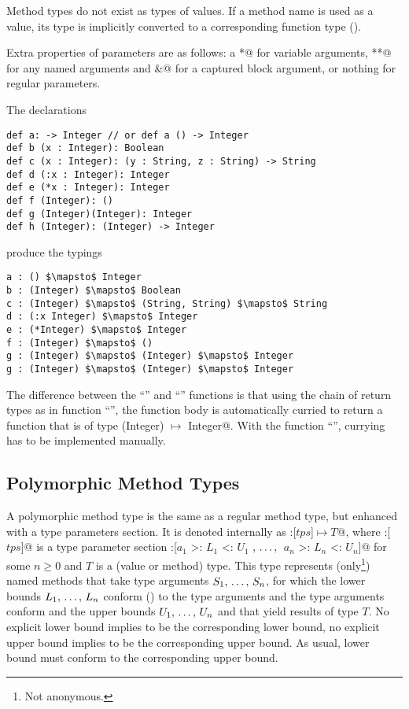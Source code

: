 Method types do not exist as types of values. If a method name is used as a value, its type is implicitly converted to a corresponding function type (). 

Extra properties of parameters are as follows: a \lstinline@*@ for variable arguments, \lstinline@**@ for any named arguments and \lstinline@&@ for a captured block argument, or nothing for regular parameters. 

\example The declarations
\begin{lstlisting}
def a: -> Integer // or def a () -> Integer
def b (x : Integer): Boolean
def c (x : Integer): (y : String, z : String) -> String
def d (:x : Integer): Integer
def e (*x : Integer): Integer
def f (Integer): ()
def g (Integer)(Integer): Integer
def h (Integer): (Integer) -> Integer
\end{lstlisting}
produce the typings
\begin{lstlisting}
a : () $\mapsto$ Integer
b : (Integer) $\mapsto$ Boolean
c : (Integer) $\mapsto$ (String, String) $\mapsto$ String
d : (:x Integer) $\mapsto$ Integer
e : (*Integer) $\mapsto$ Integer
f : (Integer) $\mapsto$ ()
g : (Integer) $\mapsto$ (Integer) $\mapsto$ Integer
g : (Integer) $\mapsto$ (Integer) $\mapsto$ Integer
\end{lstlisting}

The difference between the ``'' and ``'' functions is that using the chain of return types as in function ``'', the function body is automatically curried to return a function that is of type \lstinline@(Integer) $\mapsto$ Integer@. With the function ``'', currying has to be implemented manually. 

\subsection{Polymorphic Method Types}
\label{sec:polymorphic-method-types}

A polymorphic method type is the same as a regular method type, but enhanced with a type parameters section. It is denoted internally as \lstinline@:[$tps$]$ \mapsto T$@, where \lstinline@:[$tps$]@ is a type parameter section \lstinline@:[$a_1$ >: $L_1$ <: $U_1$ $,\, \ldots ,\,$ $a_n$ >: $L_n$ <: $U_n$]@ for some $n \geq 0$ and $T$ is a (value or method) type. This type represents (only\footnote{Not anonymous.}) named methods that take type arguments $S_1 ,\, \ldots ,\, S_n$, for which the lower bounds $L_1 ,\, \ldots ,\, L_n$ conform () to the type arguments and the type arguments conform and the upper bounds $U_1 ,\, \ldots ,\, U_n$ and that yield results of type $T$. No explicit lower bound implies  to be the corresponding lower bound, no explicit upper bound implies  to be the corresponding upper bound. As usual, lower bound must conform to the corresponding upper bound. 

